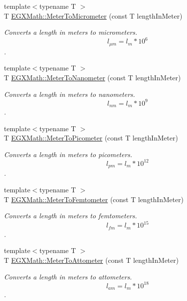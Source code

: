 \begin{DoxyCompactItemize}
{\footnotesize template$<$typename T $>$ }\\T \mbox{\hyperlink{group___e_g_x_math-_conversions-_length_conversions-_s_i-_meter-_s_i_gac0114c26af780ce603948df83f5e338e}{E\+G\+X\+Math\+::\+Meter\+To\+Micrometer}} (const T length\+In\+Meter)
\begin{DoxyCompactList}\small\item\em Converts a length in meters to micrometers. \[ l_{\mu m}=l_{m} * 10^{6} \]. \end{DoxyCompactList}\item 
{\footnotesize template$<$typename T $>$ }\\T \mbox{\hyperlink{group___e_g_x_math-_conversions-_length_conversions-_s_i-_meter-_s_i_gad3532cd9d0a9b97ae34aadc0eea27c57}{E\+G\+X\+Math\+::\+Meter\+To\+Nanometer}} (const T length\+In\+Meter)
\begin{DoxyCompactList}\small\item\em Converts a length in meters to nanometers. \[ l_{nm}=l_{m} * 10^{9} \]. \end{DoxyCompactList}\item 
{\footnotesize template$<$typename T $>$ }\\T \mbox{\hyperlink{group___e_g_x_math-_conversions-_length_conversions-_s_i-_meter-_s_i_ga5e136454c20254062d6e8637cfbfb8ee}{E\+G\+X\+Math\+::\+Meter\+To\+Picometer}} (const T length\+In\+Meter)
\begin{DoxyCompactList}\small\item\em Converts a length in meters to picometers. \[ l_{pm}=l_{m} * 10^{12} \]. \end{DoxyCompactList}\item 
{\footnotesize template$<$typename T $>$ }\\T \mbox{\hyperlink{group___e_g_x_math-_conversions-_length_conversions-_s_i-_meter-_s_i_ga9fbb9437aa02f79a445e8c6177d0153e}{E\+G\+X\+Math\+::\+Meter\+To\+Femtometer}} (const T length\+In\+Meter)
\begin{DoxyCompactList}\small\item\em Converts a length in meters to femtometers. \[ l_{fm}=l_{m} * 10^{15} \]. \end{DoxyCompactList}\item 
{\footnotesize template$<$typename T $>$ }\\T \mbox{\hyperlink{group___e_g_x_math-_conversions-_length_conversions-_s_i-_meter-_s_i_ga7c27a5231b96b904786f519e8bad257c}{E\+G\+X\+Math\+::\+Meter\+To\+Attometer}} (const T length\+In\+Meter)
\begin{DoxyCompactList}\small\item\em Converts a length in meters to attometers. \[ l_{am}=l_{m} * 10^{18} \]. \end{DoxyCompactList}\item 

\end{DoxyCompactItemize}
